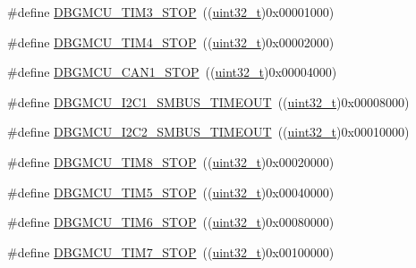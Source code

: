 \begin{DoxyCompactItemize}
\item 
\#define \hyperlink{group___d_b_g_m_c_u___exported___constants_ga28c01c2c30bed78e51d997007986fac9}{D\+B\+G\+M\+C\+U\+\_\+\+T\+I\+M3\+\_\+\+S\+T\+OP}~((\hyperlink{_p_e___types_8h_a33594304e786b158f3fb30289278f5af}{uint32\+\_\+t})0x00001000)
\item 
\#define \hyperlink{group___d_b_g_m_c_u___exported___constants_gac87363a4018e2b23a907cfaf836494f1}{D\+B\+G\+M\+C\+U\+\_\+\+T\+I\+M4\+\_\+\+S\+T\+OP}~((\hyperlink{_p_e___types_8h_a33594304e786b158f3fb30289278f5af}{uint32\+\_\+t})0x00002000)
\item 
\#define \hyperlink{group___d_b_g_m_c_u___exported___constants_ga5ef70e050d1a95f350b6585336a55ca8}{D\+B\+G\+M\+C\+U\+\_\+\+C\+A\+N1\+\_\+\+S\+T\+OP}~((\hyperlink{_p_e___types_8h_a33594304e786b158f3fb30289278f5af}{uint32\+\_\+t})0x00004000)
\item 
\#define \hyperlink{group___d_b_g_m_c_u___exported___constants_ga1c0566af96833376cf1af98449cc914b}{D\+B\+G\+M\+C\+U\+\_\+\+I2\+C1\+\_\+\+S\+M\+B\+U\+S\+\_\+\+T\+I\+M\+E\+O\+UT}~((\hyperlink{_p_e___types_8h_a33594304e786b158f3fb30289278f5af}{uint32\+\_\+t})0x00008000)
\item 
\#define \hyperlink{group___d_b_g_m_c_u___exported___constants_ga316f8eba36b7a796dd3c6b7d6640b4bf}{D\+B\+G\+M\+C\+U\+\_\+\+I2\+C2\+\_\+\+S\+M\+B\+U\+S\+\_\+\+T\+I\+M\+E\+O\+UT}~((\hyperlink{_p_e___types_8h_a33594304e786b158f3fb30289278f5af}{uint32\+\_\+t})0x00010000)
\item 
\#define \hyperlink{group___d_b_g_m_c_u___exported___constants_gaa66feea7d5f2c253fe3f431f9dd4bd1e}{D\+B\+G\+M\+C\+U\+\_\+\+T\+I\+M8\+\_\+\+S\+T\+OP}~((\hyperlink{_p_e___types_8h_a33594304e786b158f3fb30289278f5af}{uint32\+\_\+t})0x00020000)
\item 
\#define \hyperlink{group___d_b_g_m_c_u___exported___constants_gaf97e21534b3aa9482af496497a37ff4b}{D\+B\+G\+M\+C\+U\+\_\+\+T\+I\+M5\+\_\+\+S\+T\+OP}~((\hyperlink{_p_e___types_8h_a33594304e786b158f3fb30289278f5af}{uint32\+\_\+t})0x00040000)
\item 
\#define \hyperlink{group___d_b_g_m_c_u___exported___constants_ga076cf7d18c7019e99f5f15962ab317eb}{D\+B\+G\+M\+C\+U\+\_\+\+T\+I\+M6\+\_\+\+S\+T\+OP}~((\hyperlink{_p_e___types_8h_a33594304e786b158f3fb30289278f5af}{uint32\+\_\+t})0x00080000)
\item 
\#define \hyperlink{group___d_b_g_m_c_u___exported___constants_gaf593ca16ee6d3f1fabc549878f3f87f0}{D\+B\+G\+M\+C\+U\+\_\+\+T\+I\+M7\+\_\+\+S\+T\+OP}~((\hyperlink{_p_e___types_8h_a33594304e786b158f3fb30289278f5af}{uint32\+\_\+t})0x00100000)

\end{DoxyCompactItemize}

